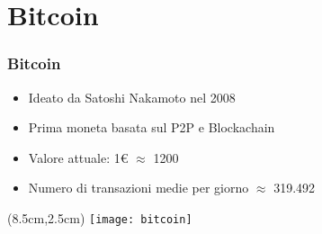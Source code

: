 \section{Bitcoin}
\begin{frame}
 \frametitle{Bitcoin}

 \begin{itemize}
  \item<1-> Ideato da Satoshi Nakamoto nel 2008
  \item<2-> Prima moneta basata sul P2P e Blockachain%
  \item<3-> Valore attuale: 1\euro{} $ \approx $  1200\bitcoin{}
  \item<4-> Numero di transazioni medie per giorno $ \approx $ 319.492
 \end{itemize}



 \begin{textblock*}{5cm}(8.5cm,2.5cm)
  \texttt{[image: bitcoin]}
 \end{textblock*}

\end{frame}
